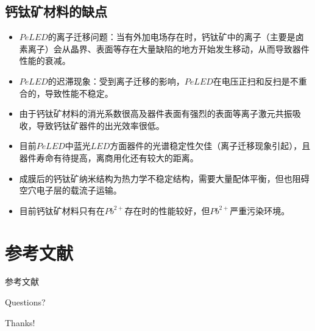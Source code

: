 \documentclass{beamer}[fontset=windows]
\begin{document}
\subsection{钙钛矿材料的缺点}
\begin{frame}
\begin{itemize}
	\item $PeLED$的离子迁移问题：当有外加电场存在时，钙钛矿中的离子（主要是卤素离子）会从晶界、表面等存在大量缺陷的地方开始发生移动，从而导致器件性能的衰减。
	\item $PeLED$的迟滞现象：受到离子迁移的影响，$PeLED$在电压正扫和反扫是不重合的，导致性能不稳定。
	\item 由于钙钛矿材料的消光系数很高及器件表面有强烈的表面等离子激元共振吸收，导致钙钛矿器件的出光效率很低。
	\item 目前$PeLED$中蓝光$LED$方面器件的光谱稳定性欠佳（离子迁移现象引起），且器件寿命有待提高，离商用化还有较大的距离。
	\item 成膜后的钙钛矿纳米结构为热力学不稳定结构，需要大量配体平衡，但也阻碍空穴电子层的载流子运输。
	\item 目前钙钛矿材料只有在$Pb^{2+}$存在时的性能较好，但$Pb^{2+}$严重污染环境。
\end{itemize}
\end{frame}	
    \section{参考文献}	
    \begin{frame}[allowframebreaks]{参考文献}
    \printbibliography[heading=none]
    \end{frame}
	\begin{frame}
		\begin{center}
			{\Huge\calligra Questions?}
		\end{center}
	\end{frame}
	\begin{frame}
		\begin{center}
			{\Huge\calligra Thanks!}
		\end{center}
	\end{frame}
\end{document}
